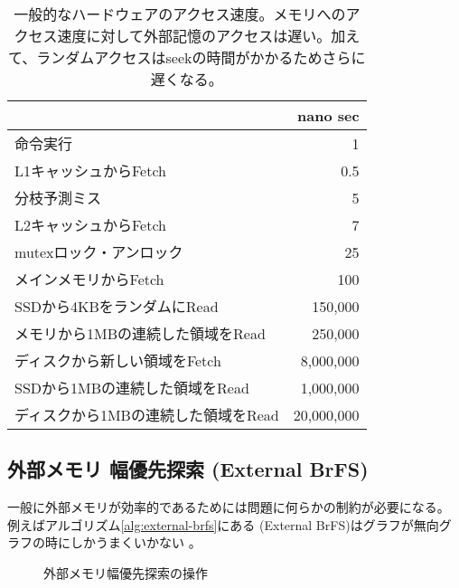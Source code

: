 \begin{table}
\centering
\caption{一般的なハードウェアのアクセス速度。メモリへのアクセス速度に対して外部記憶のアクセスは遅い。加えて、ランダムアクセスはseekの時間がかかるためさらに遅くなる。 }
\label{tbl:latency}
\begin{tabular}{|l|r|}
		   & nano sec \\ \hline
	命令実行 & 1 \\
	L1キャッシュからFetch & 0.5 \\
	分枝予測ミス 		& 5 \\
	L2キャッシュからFetch & 7 \\
	mutexロック・アンロック			& 25 \\
	メインメモリからFetch  	& 100 \\
	SSDから4KBをランダムにRead         & 150,000 \\
	メモリから1MBの連続した領域をRead & 250,000 \\
	ディスクから新しい領域をFetch & 8,000,000 \\
	SSDから1MBの連続した領域をRead		& 1,000,000 \\
	ディスクから1MBの連続した領域をRead 	& 20,000,000 \\
	
\end{tabular}
\end{table}

\subsection{外部メモリ 幅優先探索 (External BrFS)}
\label{sec:external-brfs}

一般に外部メモリが効率的であるためには問題に何らかの制約が必要になる。
例えばアルゴリズム\ref{alg:external-brfs}にある (External BrFS)はグラフが無向グラフの時にしかうまくいかない \cite{mehlhorn2002external}。

\begin{figure}
  \centering
  \scalebox{0.75}{
  \begin{tikzpicture}[scale=0.6]
    
  \end{tikzpicture}
  }
  \caption{外部メモリ幅優先探索の操作}
  \label{fig:external-brfs}
\end{figure}

